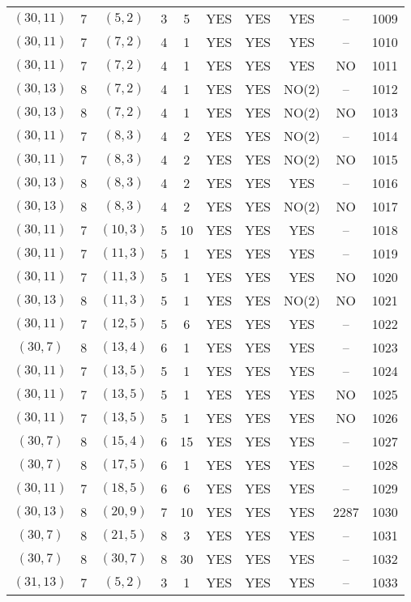 \begin{longtable}{|c|c|c|c|c|c|c|c|c|c|}
$(30, 11)$ & 7 & $(5, 2)$ & 3 & 5 & YES & YES & YES & -- & 1009\\
$(30, 11)$ & 7 & $(7, 2)$ & 4 & 1 & YES & YES & YES & -- & 1010\\
$(30, 11)$ & 7 & $(7, 2)$ & 4 & 1 & YES & YES & YES & NO & 1011\\
$(30, 13)$ & 8 & $(7, 2)$ & 4 & 1 & YES & YES & NO(2) & -- & 1012\\
$(30, 13)$ & 8 & $(7, 2)$ & 4 & 1 & YES & YES & NO(2) & NO & 1013\\
$(30, 11)$ & 7 & $(8, 3)$ & 4 & 2 & YES & YES & NO(2) & -- & 1014\\
$(30, 11)$ & 7 & $(8, 3)$ & 4 & 2 & YES & YES & NO(2) & NO & 1015\\
$(30, 13)$ & 8 & $(8, 3)$ & 4 & 2 & YES & YES & YES & -- & 1016\\
$(30, 13)$ & 8 & $(8, 3)$ & 4 & 2 & YES & YES & NO(2) & NO & 1017\\
$(30, 11)$ & 7 & $(10, 3)$ & 5 & 10 & YES & YES & YES & -- & 1018\\
$(30, 11)$ & 7 & $(11, 3)$ & 5 & 1 & YES & YES & YES & -- & 1019\\
$(30, 11)$ & 7 & $(11, 3)$ & 5 & 1 & YES & YES & YES & NO & 1020\\
$(30, 13)$ & 8 & $(11, 3)$ & 5 & 1 & YES & YES & NO(2) & NO & 1021\\
$(30, 11)$ & 7 & $(12, 5)$ & 5 & 6 & YES & YES & YES & -- & 1022\\
$(30, 7)$ & 8 & $(13, 4)$ & 6 & 1 & YES & YES & YES & -- & 1023\\
$(30, 11)$ & 7 & $(13, 5)$ & 5 & 1 & YES & YES & YES & -- & 1024\\
$(30, 11)$ & 7 & $(13, 5)$ & 5 & 1 & YES & YES & YES & NO & 1025\\
$(30, 11)$ & 7 & $(13, 5)$ & 5 & 1 & YES & YES & YES & NO & 1026\\
$(30, 7)$ & 8 & $(15, 4)$ & 6 & 15 & YES & YES & YES & -- & 1027\\
$(30, 7)$ & 8 & $(17, 5)$ & 6 & 1 & YES & YES & YES & -- & 1028\\
$(30, 11)$ & 7 & $(18, 5)$ & 6 & 6 & YES & YES & YES & -- & 1029\\
$(30, 13)$ & 8 & $(20, 9)$ & 7 & 10 & YES & YES & YES & 2287 & 1030\\
$(30, 7)$ & 8 & $(21, 5)$ & 8 & 3 & YES & YES & YES & -- & 1031\\
$(30, 7)$ & 8 & $(30, 7)$ & 8 & 30 & YES & YES & YES & -- & 1032\\
$(31, 13)$ & 7 & $(5, 2)$ & 3 & 1 & YES & YES & YES & -- & 1033\\

\end{longtable}
